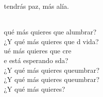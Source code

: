 \begin{cancion}
	tendrás paz, más alía.\\\jump\\
	\begin{chorus}%
	 qué más quieres que alumbrar?\\
	¿Y qué más quieres que d vida?\\
	ué más quieres que cre \\
	e está esperando sda?\\
\jump
	¿Y qué más quieres queumbrar?\\
	¿Y qué más quieres queumbrar?\\
¿Y qué más quieres?\\
	\end{chorus}%
	\jump\\
\end{cancion}%
